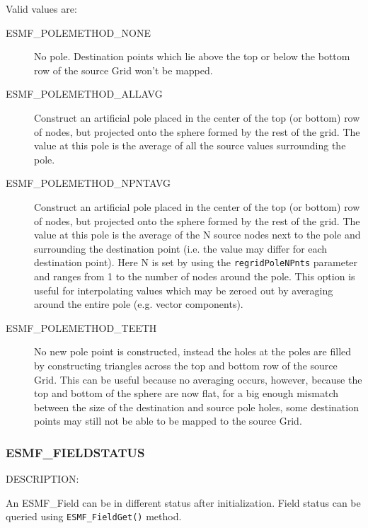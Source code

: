Valid values are:
\begin{description}
\item [ESMF\_POLEMETHOD\_NONE]
      No pole. Destination points which lie above the top or below the bottom row of the source Grid won't be mapped. 
\item [ESMF\_POLEMETHOD\_ALLAVG]
      Construct an artificial pole placed in the center of the top (or bottom) row of nodes, but projected onto the sphere formed by the rest of the grid. The value at this pole is the average of all the source values surrounding the pole.
\item [ESMF\_POLEMETHOD\_NPNTAVG] Construct an artificial pole placed in the center of the top (or bottom) row of nodes, but projected onto the sphere formed by the rest of the grid. The value at this pole is the average of the N source nodes next to the pole and surrounding the destination point (i.e. the value may differ for each destination point). Here N is set by using the {\tt regridPoleNPnts} parameter and ranges from 1 to the number of nodes around the pole. This option is useful for interpolating values which may be zeroed out by averaging around the entire pole (e.g. vector components). 
\item [ESMF\_POLEMETHOD\_TEETH]
    No new pole point is constructed, instead the holes at the poles are filled by constructing triangles across the top and bottom row of the source Grid. This can be useful because no averaging occurs, however, because the top and bottom of the sphere are now flat, for a big enough mismatch between the size of the destination and source pole holes, some destination points may still not be able to be mapped to the source Grid. 

\end{description}

\subsubsection{ESMF\_FIELDSTATUS}
\label{opt:fieldstatus}
{\sf DESCRIPTION:\\}  
\begin{sloppypar}
An {ESMF\_Field} can be in different status after initialization. Field status can be queried using {\tt ESMF\_FieldGet()} method.
\end{sloppypar}

